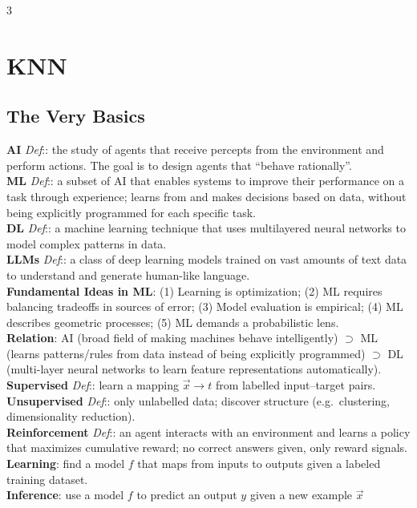 \documentclass[10pt]{article}
\newcommand{\sub}[1]{\textit{#1}:}  %
\begin{document}
\fontsize{5.5}{6.4}\selectfont
\raggedcolumns
\begin{multicols*}{3}

\section{KNN}
\subsection{The Very Basics}
\textbf{AI} \sub{Def}: the study of agents that receive percepts from the environment and perform actions. The goal is to design agents that ``behave rationally''.\\
\textbf{ML} \sub{Def}: a subset of AI that enables systems to improve their performance on a task through experience; learns from and makes decisions based on data, without being explicitly programmed for each specific task.\\
\textbf{DL} \sub{Def}: a machine learning technique that uses multilayered neural networks to model complex patterns in data.\\
\textbf{LLMs} \sub{Def}: a class of deep learning models trained on vast amounts of text data to understand and generate human-like language.\\
\textbf{Fundamental Ideas in ML}: (1) Learning is optimization; (2) ML requires balancing tradeoffs in sources of error; (3) Model evaluation is empirical; (4) ML describes geometric processes; (5) ML demands a probabilistic lens.\\
\textbf{Relation}: AI (broad field of making machines behave intelligently) $\supset$ ML (learns patterns/rules from data instead of being explicitly programmed) $\supset$ DL (multi-layer neural networks to learn feature representations automatically).\\
\textbf{Supervised} \sub{Def}: learn a mapping $\vec{x}\to t$ from labelled input--target pairs.\\
\textbf{Unsupervised} \sub{Def}: only unlabelled data; discover structure (e.g.\ clustering, dimensionality reduction).\\
\textbf{Reinforcement} \sub{Def}: an agent interacts with an environment and learns a policy that maximizes cumulative reward; no correct answers given, only reward signals.\\
\textbf{Learning}: find a model $f$ that maps from inputs to outputs given a labeled training dataset.\\
\textbf{Inference}: use a model $f$ to predict an output $y$ given a new example $\vec{x}$\\

\end{multicols*}
\end{document}
